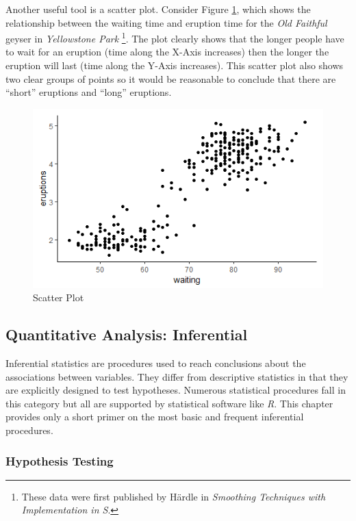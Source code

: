 Another useful tool is a scatter plot. Consider Figure \ref{14:fig05}, which shows the relationship between the waiting time and eruption time for the \textit{Old Faithful} geyser in \textit{Yellowstone Park} \footnote{These data were first published by H{\"a}rdle in \textit{Smoothing Techniques with Implementation in S}\cite{hardle2012smoothing}.}. The plot clearly shows that the longer people have to wait for an eruption (time along the X-Axis increases) then the longer the eruption will last (time along the Y-Axis increases). This scatter plot also shows two clear groups of points so it would be reasonable to conclude that there are ``short'' eruptions and ``long'' eruptions.

\begin{figure}[H]
	\centering
	\includegraphics[width=\maxwidth{.95\linewidth}]{gfx/14-Faithful}
	\caption{Scatter Plot}
	\label{14:fig05}
\end{figure}

\subsection{Quantitative Analysis: Inferential}

Inferential statistics are procedures used to reach conclusions about the associations between variables. They differ from descriptive statistics in that they are explicitly designed to test hypotheses. Numerous statistical procedures fall in this category but all are supported by statistical software like \textit{R}. This chapter provides only a short primer on the most basic and frequent inferential procedures.

\subsubsection{Hypothesis Testing}

